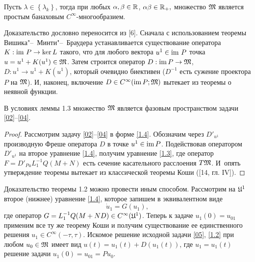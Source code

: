 \smallskip
\begin{lemma}[1.3] Пусть $\lambda\in\left\{\lambda_k\right\}$, тогда при любых $\alpha, \beta\in \Bbb R$, $\alpha\beta\in\Bbb R_+,$ множество $\frak M$ является простым банаховым $C^\infty$-многообразием. \end{lemma}
\smallskip

Доказательство дословно переносится из [6]. Сначала с использованием теоремы Вишика"--~Минти"--~Браудера устанавливается существование оператора $K : {\rm im}\,\, P\to \ker L$ такого, что для любого вектора $u^1\in {\rm im}\,\, P$ точка $u = u^1 + K (u^1)\in\frak M$. Затем строится оператор $D: {\rm im}\,P\to\frak M$, $D:u^1 \to u^1 + K (u^1)$, который очевидно биективен ($D^{-1}$ есть сужение проектора $P$ на $\frak M$). 
И, наконец, включение $D\in C^\infty ({\rm im}\, P; \frak M)$ вытекает из теоремы о неявной функции.

\smallskip
  \begin{theorem}[1.2] 	 В условиях леммы {\rm1.3} множество $\frak M$ является фазовым прос\-т\-ранством задачи \eqref{02}--\eqref{04}.\end{theorem}



  \begin{proof} Рассмотрим задачу \eqref{02}--\eqref{04} в форме \eqref{1.4}. Обозначим через $D'_{u^1}$ производную Фреше оператора $D$ в точке $u^1\in {\rm im}\, P$. Подействовав оператором $D'_{u^1}$ на второе уравнение \eqref{1.4}, получим уравнение \eqref{1.3}, где оператор $F=D'_{Pu}L^{-1}_1 Q (M+N)$ есть сечение касательного расслоения $T\frak M$. И~опять утверждение теоремы вытекает из классической теоремы Коши ([14, гл. IV]).\end{proof}

\smallskip

\begin{remark}[1.2] Доказательство теоремы 1.2 можно провести иным способом. Рассмотрим на $\frak U^1$ второе (нижнее) уравнение \eqref{1.4}, которое запишем в эквивалентном виде \begin{equation}\label{1.6} \dot{u}_1 = G (u_1),\end{equation} где оператор $G=L^{-1}_1 Q (M+ ND)\in C^\infty (\frak U^1)$. Теперь к задаче $u_1 (0) = u_{01}$ применим все ту же теорему Коши и получим существование ее единственного решения $u_1\in C^\infty (-\tau, \tau)$. Искомое решение исходной задачи \eqref{05}, \eqref{1.2} при любом $u_0\in\frak M$ имеет вид $u(t)=u_1 (t) + D (u_1 (t))$, где $u_1=u_1(t)$ решение задачи $u_1 (0)= u_{01} = Pu_0$. \end{remark}

